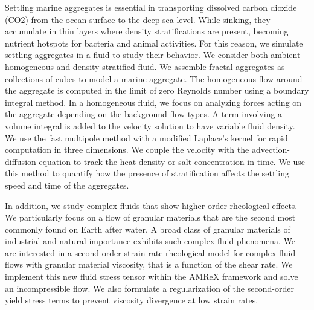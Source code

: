 
\par
Settling marine aggregates is essential in transporting dissolved carbon dioxide (CO2) from the ocean surface to the deep sea level. While sinking, they accumulate in thin layers where density stratifications are present, becoming nutrient hotspots for bacteria and animal activities. For this reason, we simulate settling aggregates in a fluid to study their behavior. We consider both ambient homogeneous and density-stratified fluid. We assemble fractal aggregates as collections of cubes to model a marine aggregate. The homogeneous flow around the aggregate is computed in the limit of zero Reynolds number using a boundary integral method. 
In a homogeneous fluid, we focus on analyzing forces acting on the aggregate depending on the background flow types. 
A term involving a volume integral is added to the velocity solution to have variable fluid density. We use the fast multipole method with a modified Laplace's kernel for rapid computation in three dimensions. We couple the velocity with the advection-diffusion equation to track the heat density or salt concentration in time. We use this method to quantify how the presence of stratification affects the settling speed and time of the aggregates.
\par
In addition, we study complex fluids that show higher-order rheological effects. 
We particularly focus on a flow of granular materials that are the second most commonly found on Earth after water. 
A broad class of granular materials of industrial and natural importance exhibits such complex fluid phenomena. We are interested in a second-order strain rate rheological model for complex fluid flows with granular material viscosity, that is a function of the shear rate.
We implement this new fluid stress tensor within the AMReX framework and solve an incompressible flow.
We also formulate a regularization of the second-order yield stress terms to prevent viscosity divergence at low strain rates.